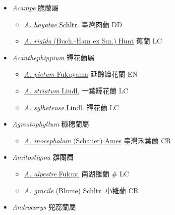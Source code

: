 
  \begin{itemize}
 \item[] \textit{Acampe} 脆蘭屬
                                
  \begin{itemize}
        \item[] \href{http://www.theplantlist.org/tpl1.1/search?q=Acampe+hayatae}{\textit{A. hayatae} Schltr.}   臺灣肉蘭   DD
        \item[] \href{http://www.theplantlist.org/tpl1.1/search?q=Acampe+rigida}{\textit{A. rigida} (Buch.-Ham ex Sm.) Hunt}   蕉蘭   LC
  \end{itemize}
 \item[] \textit{Acanthephippium} 罈花蘭屬
                                
  \begin{itemize}
        \item[] \href{http://www.theplantlist.org/tpl1.1/search?q=Acanthephippium+pictum}{\textit{A. pictum} Fukuyama}   延齡罈花蘭   EN
        \item[] \href{http://www.theplantlist.org/tpl1.1/search?q=Acanthephippium+striatum}{\textit{A. striatum} Lindl.}   一葉罈花蘭   LC
        \item[] \href{http://www.theplantlist.org/tpl1.1/search?q=Acanthephippium+sylhetense}{\textit{A. sylhetense} Lindl.}   罈花蘭   LC
  \end{itemize}
 \item[] \textit{Agrostophyllum} 糠穗蘭屬
                                
  \begin{itemize}
        \item[] \href{http://www.theplantlist.org/tpl1.1/search?q=Agrostophyllum+inocephalum}{\textit{A. inocephalum} (Schauer) Ames}   臺灣禾葉蘭   CR
  \end{itemize}
 \item[] \textit{Amitostigma} 雛蘭屬
                                
  \begin{itemize}
        \item[] \href{http://www.theplantlist.org/tpl1.1/search?q=Amitostigma+alpestre}{\textit{A. alpestre} Fukuy.}   南湖雛蘭  \# LC
        \item[] \href{http://www.theplantlist.org/tpl1.1/search?q=Amitostigma+gracile}{\textit{A. gracile} (Blume) Schltr.}   小雛蘭   CR
  \end{itemize}
 \item[] \textit{Androcorys} 兜蕊蘭屬
                                

\end{itemize}
